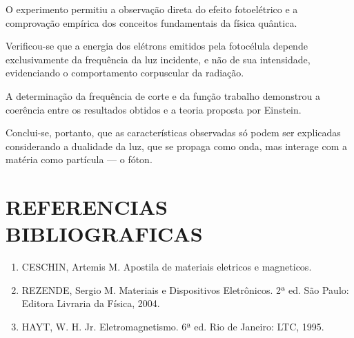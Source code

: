 \documentclass[10pt,twocolumn,letterpaper]{article}
\begin{document}
\hspace{1cm} O experimento permitiu a observação direta do efeito fotoelétrico e a comprovação empírica dos conceitos fundamentais da física quântica.

\hspace{1cm} Verificou-se que a energia dos elétrons emitidos pela fotocélula depende exclusivamente da frequência da luz incidente, e não de sua intensidade, evidenciando o comportamento corpuscular da radiação.

\hspace{1cm} A determinação da frequência de corte e da função trabalho demonstrou a coerência entre os resultados obtidos e a teoria proposta por Einstein.

\hspace{1cm} Conclui-se, portanto, que as características observadas só podem ser explicadas considerando a dualidade da luz, que se propaga como onda, mas interage com a matéria como partícula — o fóton.

\section{REFERENCIAS BIBLIOGRAFICAS}

{\small
\begin{enumerate}

    \item CESCHIN, Artemis M. Apostila de materiais eletricos e magneticos.

    \item REZENDE, Sergio M. Materiais e Dispositivos Eletrônicos. 2ª ed. São Paulo: Editora Livraria da Física, 2004.

    \item HAYT, W. H. Jr. Eletromagnetismo. 6ª ed. Rio de Janeiro: LTC, 1995.
    
\end{enumerate}
}
\end{document}
